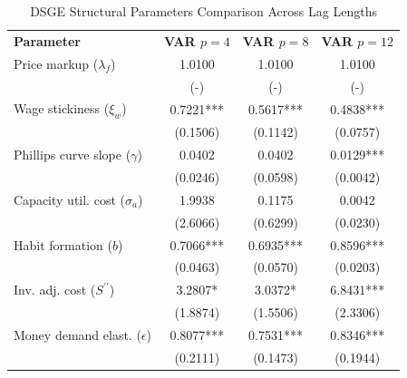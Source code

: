 \begin{table}[htpb]
    \centering
    \small
    \renewcommand{\arraystretch}{1.2}
    \caption{DSGE Structural Parameters Comparison Across Lag Lengths}
    \label{tab:dsge_params_comparison_4_8_12}
    \begin{tabular}{lccc}
    \toprule
    \textbf{Parameter} & \textbf{VAR $p=4$} & \textbf{VAR $p=8$} & \textbf{VAR $p=12$} \\
    Price markup ($\lambda_f$) & 1.0100 & 1.0100 & 1.0100 \\
    & (-) & (-) & (-) \\
    Wage stickiness ($\xi_w$) & 0.7221*** & 0.5617*** & 0.4838*** \\
    & (0.1506) & (0.1142) & (0.0757) \\
    Phillips curve slope ($\gamma$) & 0.0402 & 0.0402 & 0.0129*** \\
    & (0.0246) & (0.0598) & (0.0042) \\
    Capacity util. cost ($\sigma_a$) & 1.9938 & 0.1175 & 0.0042 \\
    & (2.6066) & (0.6299) & (0.0230) \\
    Habit formation ($b$) & 0.7066*** & 0.6935*** & 0.8596*** \\
    & (0.0463) & (0.0570) & (0.0203) \\
    Inv. adj. cost ($S^{\prime\prime}$) & 3.2807* & 3.0372* & 6.8431*** \\
    & (1.8874) & (1.5506) & (2.3306) \\
    Money demand elast. ($\epsilon$) & 0.8077*** & 0.7531*** & 0.8346*** \\
    & (0.2111) & (0.1473) & (0.1944) \\
    \bottomrule
    \end{tabular}
\end{table}
